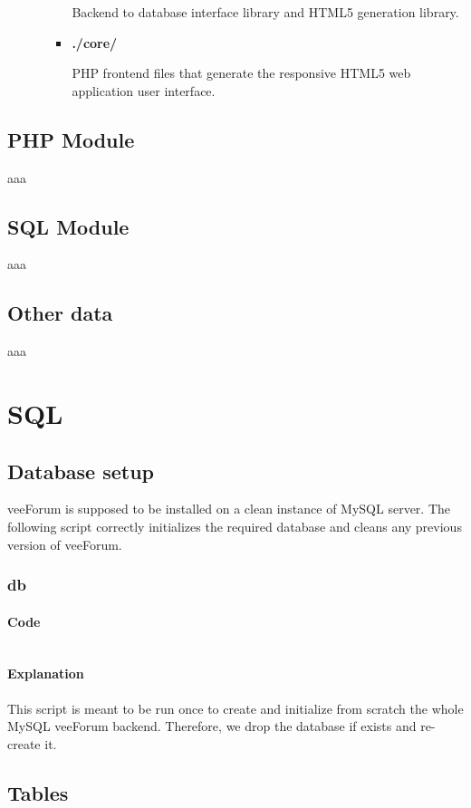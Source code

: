 \documentclass[12pt]{report}
\renewcommand\emph{\textbf}
\newcommand{\printSQLtest}[1]
{
    \inputminted[linenos, breaklines, breakbytoken, tabsize=4, fontsize=\footnotesize]{mysql}{#1}
}
\newcommand{\printSQLTablepage}[2]
{
    \newpage
    \subsection{#2}
    \subsubsection{Code}
    \printSQLtest{../sql/parts/#1}
    \subsubsection{Explanation}
}
\begin{document}
\begin{itemize}
\begin{itemize}
\begin{itemize}
                            Backend to database interface library and HTML5 generation library.

                            \item \emph{./core/}

                            PHP frontend files that generate the responsive HTML5 web application user interface.
                        \end{itemize}

                    \end{itemize}

            \end{itemize}

            \section{PHP Module}
                aaa

            \section{SQL Module}
                aaa

            \section{Other data}
                aaa

        \chapter{SQL}

            \newpage
            \section{Database setup}

                veeForum is supposed to be installed on a clean instance of MySQL server. The following script correctly initializes the required database and cleans any previous version of veeForum.

                \printSQLTablepage{00_db.sql}{db}
                    This script is meant to be run once to create and initialize from scratch the whole MySQL veeForum backend.
                    Therefore, we drop the database if exists and re-create it.

            \newpage
            \section{Tables}
\end{document}
